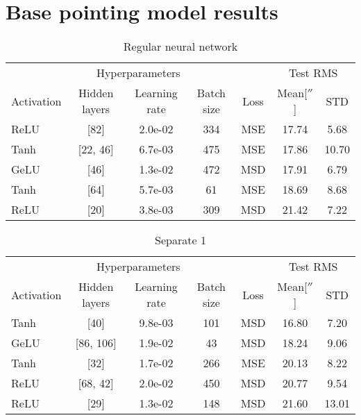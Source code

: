 \section{Base pointing model results}
\begin{table}[h]
    \centering
    \caption{Regular neural network}
    \begin{tabular}{lcccccc}
        \toprule
        \multicolumn{5}{c}{Hyperparameters} & \multicolumn{2}{c}{Test RMS} \\
        \cmidrule(lr){1-5} \cmidrule(lr){6-7}
        Activation & Hidden layers & Learning rate & Batch size & Loss & Mean[$''$] & STD\\
        \midrule
        ReLU &        [82] &       2.0e-02 &        334 & MSE &    17.74 &  5.68 \\
        Tanh &    [22, 46] &       6.7e-03 &        475 & MSE &    17.86 & 10.70 \\
        GeLU &        [46] &       1.3e-02 &        472 & MSD &    17.91 &  6.79 \\
        Tanh &        [64] &       5.7e-03 &         61 & MSE &    18.69 &  8.68 \\
        ReLU &        [20] &       3.8e-03 &        309 & MSD &    21.42 &  7.22 \\
  \bottomrule
    \end{tabular}
\end{table}

\begin{table}[h]
    \centering
    \caption{Separate 1}
    \begin{tabular}{lcccccc}
        \toprule
        \multicolumn{5}{c}{Hyperparameters} & \multicolumn{2}{c}{Test RMS} \\
        \cmidrule(lr){1-5} \cmidrule(lr){6-7}
        Activation & Hidden layers & Learning rate & Batch size & Loss & Mean[$''$] & STD \\
        \midrule
        Tanh &        [40] &       9.8e-03 &        101 & MSD &    16.80 &  7.20 \\
        GeLU &   [86, 106] &       1.9e-02 &         43 & MSD &    18.24 &  9.06 \\
        Tanh &        [32] &       1.7e-02 &        266 & MSE &    20.13 &  8.22 \\
        ReLU &    [68, 42] &       2.0e-02 &        450 & MSD &    20.77 &  9.54 \\
        ReLU &        [29] &       1.3e-02 &        148 & MSD &    21.60 & 13.01 \\
  \bottomrule
    \end{tabular}
\end{table}

